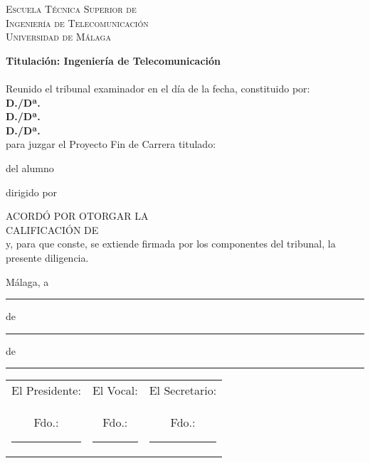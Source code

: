 \thispagestyle{empty}
\begin{spacing}{1}
\begin{center}
	\Large \sffamily \scshape %
	Escuela Técnica Superior de\\
	Ingeniería de Telecomunicación\\
	Universidad de Málaga
\end{center}

	{\bfseries \noindent Titulación: Ingeniería de Telecomunicación \\
	}\\[3ex]

	\noindent Reunido el tribunal examinador en el día de la fecha, constituido por:\\[3ex]
	\textbf{D./Dª.~}\hrulefill\\[3ex]
	\textbf{D./Dª.~}\hrulefill\\[3ex]
	\textbf{D./Dª.~}\hrulefill\\[3ex]
	
	para juzgar el Proyecto Fin de Carrera titulado:\noindent 
	
\begin{center}
	\large \bfseries \pfctitlename
\end{center}

\noindent del alumno 

\noindent dirigido por 

\bigskip

	\noindent ACORDÓ POR \hrulefill OTORGAR LA\\[3ex]%
	CALIFICACIÓN DE\hrulefill\\[3ex]
	
	
	\noindent y, para que conste, se extiende firmada por los componentes del tribunal, la presente diligencia.
	
	\bigskip

\hfill Málaga, a \rule{1cm}{0.1mm} de \rule{1cm}{0.1mm} de \rule{0.7cm}{0.1mm}

\vskip 10pt

\begin{center}
	\begin{tabular}{ccc}
	El Presidente: & El Vocal: & El Secretario:\\[2cm]
	Fdo.:\rule{3cm}{0.1mm} & Fdo.:\rule{3cm}{0.1mm} & Fdo.:\rule{3cm}{0.1mm}	
	\end{tabular}
\end{center}
\end{spacing}
\blankpage
